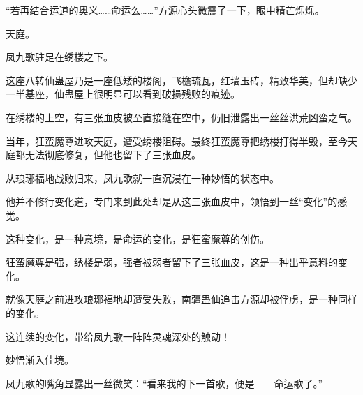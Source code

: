 \begin{this_body}
“若再结合运道的奥义……命运么……”方源心头微震了一下，眼中精芒烁烁。

天庭。

凤九歌驻足在绣楼之下。

这座八转仙蛊屋乃是一座低矮的楼阁，飞檐琉瓦，红墙玉砖，精致华美，但却缺少一半基座，仙蛊屋上很明显可以看到破损残败的痕迹。

在绣楼的上空，有三张血皮被至直接缝在空中，仍旧泄露出一丝丝洪荒凶蛮之气。

当年，狂蛮魔尊进攻天庭，遭受绣楼阻碍。最终狂蛮魔尊把绣楼打得半毁，至今天庭都无法彻底修复，但他也留下了三张血皮。

从琅琊福地战败归来，凤九歌就一直沉浸在一种妙悟的状态中。

他并不修行变化道，专门来到此处却是从这三张血皮中，领悟到一丝“变化”的感觉。

这种变化，是一种意境，是命运的变化，是狂蛮魔尊的创伤。

狂蛮魔尊是强，绣楼是弱，强者被弱者留下了三张血皮，这是一种出乎意料的变化。

就像天庭之前进攻琅琊福地却遭受失败，南疆蛊仙追击方源却被俘虏，是一种同样的变化。

这连续的变化，带给凤九歌一阵阵灵魂深处的触动！

妙悟渐入佳境。

凤九歌的嘴角显露出一丝微笑：“看来我的下一首歌，便是——命运歌了。”

\end{this_body}

